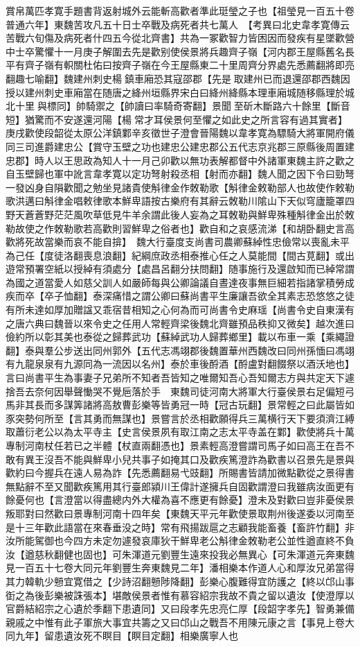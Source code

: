 賞帛萬匹孝寛手題書背返射城外云能斬高歡者準此珽瑩之子也【祖瑩見一百五十卷普通六年】東魏苦攻凡五十日士卒戰及病死者共七萬人　【考異曰北史韋孝寛傳云苦戰六旬傷及病死者什四五今從北齊書】共為一冢歡智力皆困因而發疾有星墜歡營中士卒驚懼十一月庚子解圍去先是歡别使侯景將兵趣齊子嶺【河内郡王屋縣舊名長平有齊子嶺有軹關杜佑曰按齊子嶺在今王屋縣東二十里周齊分界處先悉薦翻將即亮翻趣七喻翻】魏建州刺史楊鎮車廂恐其寇邵郡【先是取建州已而退還邵郡西魏因授以建州刺史車廂當在随唐之絳州垣縣界宋白曰絳州絳縣本理車廂城随移縣理於城北十里與標同】帥騎禦之【帥讀曰率騎奇寄翻】景聞至斫木斷路六十餘里【斷音短】猶驚而不安遂還河陽【楊常才耳侯景何至懼之如此史之所言容有過其實者】庚戌歡使段韶從太原公洋鎮鄴辛亥徵世子澄會晉陽魏以韋孝寛為驃騎大將軍開府儀同三司進爵建忠公【賞守玉壁之功也建忠公建忠郡公五代志京兆郡三原縣後周置建忠郡】時人以王思政為知人十一月己卯歡以無功表解都督中外諸軍東魏主許之歡之自玉壁歸也軍中訛言韋孝寛以定功弩射殺丞相【射而亦翻】魏人聞之因下令曰勁弩一發凶身自隕歡聞之勉坐見諸貴使斛律金作敇勒歌【斛律金敕勒部人也故使作敕勒歌洪邁曰斛律金唱敕律歌本鮮卑語按古樂府有其辭云敇勒川隂山下天似穹廬籠罩四野天蒼蒼野茫茫風吹草低見牛羊余謂此後人妄為之耳敇勒與鮮卑殊種斛律金出於敇勒故使之作敇勒歌若高歡則習鮮卑之俗者也】歡自和之哀感流涕【和胡卧翻史言高歡將死故當樂而哀不能自揜】　魏大行臺度支尚書司農卿蘇綽性忠儉常以喪亂未平為己任【度徒洛翻喪息浪翻】紀綱庶政丞相泰推心任之人莫能間【間古莧翻】或出遊常預署空紙以授綽有須處分【處昌呂翻分扶問翻】随事施行及還啟知而已綽常謂為國之道當愛人如慈父訓人如嚴師每與公卿論議自晝達夜事無巨細若指諸掌積勞成疾而卒【卒子恤翻】泰深痛惜之謂公卿曰蘇尚書平生廉讓吾欲全其素志恐悠悠之徒有所未達如厚加贈諡又乖宿昔相知之心何為而可尚書令史麻瑶【尚書令史自東漢有之唐六典曰魏晉以來令史之任用人常輕齊梁後魏北齊雖預品秩抑又微矣】越次進曰儉約所以彰其美也泰從之歸葬武功【蘇綽武功人歸葬鄉里】載以布車一乘【乘繩證翻】泰與羣公步送出同州郭外【五代志馮翊郡後魏置華州西魏改曰同州孫愐曰馮翊有九龍泉泉有九源同為一流因以名州】泰於車後酹酒【酹盧對翻餟祭以酒沃地也】言曰尚書平生為事妻子兄弟所不知者吾皆知之唯爾知吾心吾知爾志方與共定天下遽捨吾去奈何因舉聲慟哭不覺巵落於手　東魏司徒河南大將軍大行臺侯景右足偏短弓馬非其長而多謀筭諸將高敖曹彭樂等皆勇冠一時【冠古玩翻】景常輕之曰此屬皆如豕突勢何所至【言其勇而無謀也】景嘗言於丞相歡願得兵三萬横行天下要須濟江縛取蕭衍老公以為太平寺主【史言侯景夙有取江南之志太平寺盖在鄴】歡使將兵十萬專制河南杖任若已之半體【杖直兩翻憑也】景素輕高澄嘗謂司馬子如曰高王在吾不敢有異王沒吾不能與鮮卑小兒共事子如掩其口及歡疾篤澄詐為歡書以召景先是景與歡約曰今握兵在遠人易為詐【先悉薦翻易弋豉翻】所賜書皆請加微點歡從之景得書無點辭不至又聞歡疾篤用其行臺郎潁川王偉計遂擁兵自固歡謂澄曰我雖病汝面更有餘憂何也【言澄當以得盡總内外大權為喜不應更有餘憂】澄未及對歡曰豈非憂侯景叛耶對曰然歡曰景專制河南十四年矣【東魏天平元年歡使景取荆州後遂委以河南至是十三年歡此語當在來春垂没之時】常有飛揚跋扈之志顧我能畜養【畜許竹翻】非汝所能駕御也今四方未定勿遽發哀庫狄干鮮卑老公斛律金敇勒老公並性遒直終不負汝【遒慈秋翻健也固也】可朱渾道元劉豐生遠來投我必無異心【可朱渾道元奔東魏見一百五十七卷大同元年劉豐生奔東魏見二年】潘相樂本作道人心和厚汝兄弟當得其力韓軌少戅宜寛借之【少詩沼翻戅陟降翻】彭樂心腹難得宜防護之【終以邙山事衘之為後彭樂被誅張本】堪敵侯景者惟有慕容紹宗我故不貴之留以遺汝【使澄厚以官爵結紹宗之心遺於季翻下患遺同】又曰段孝先忠亮仁厚【段韶字孝先】智勇兼備親戚之中惟有此子軍旅大事宜共籌之又曰邙山之戰吾不用陳元康之言【事見上卷大同九年】留患遺汝死不瞑目【瞑目定翻】相樂廣寧人也
